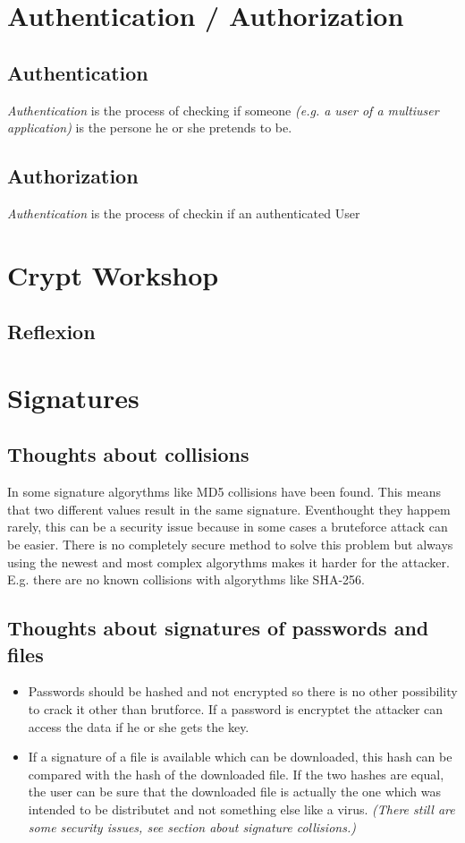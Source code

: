 \documentclass[11pt,twoside,a4paper]{article}
\begin{document}
\section{Authentication / Authorization}
\subsection{Authentication}

\textit{Authentication} is the process of checking if someone \textit{(e.g. a user of a multiuser application)} is the persone he or she pretends to be.

\subsection{Authorization}

\textit{Authentication} is the process of checkin if an authenticated User

\section{Crypt Workshop}
\subsection{Reflexion}
\section{Signatures}
\subsection{Thoughts about collisions}
In some signature algorythms like MD5 collisions have been found. This means that two different values result in the same signature. Eventhought they happem rarely, this can be a security issue because in some cases a bruteforce attack can be easier. There is no completely secure method to solve this problem but always using the newest and most complex algorythms makes it harder for the attacker. E.g. there are no known collisions with algorythms like SHA-256.
\subsection{Thoughts about signatures of passwords and files}
\begin{itemize}
	\item Passwords should be hashed and not encrypted so there is no other possibility to crack it other than brutforce. If a password is encryptet the attacker can access the data if he or she gets the key.
	\item If a signature of a file is available which can be downloaded, this hash can be compared with the hash of the downloaded file. If the two hashes are equal, the user can be sure that the downloaded file is actually the one which was intended to be distributet and not something else like a virus. \textit{(There still are some security issues, see section about signature collisions.)}
\end{itemize}
\end{document}
